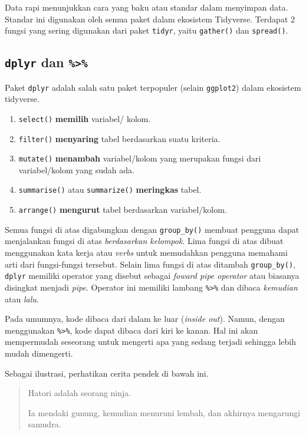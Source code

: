\documentclass[]{book}
\providecommand{\tightlist}{%
  \setlength{\itemsep}{0pt}\setlength{\parskip}{0pt}}
\begin{document}
Data rapi menunjukkan cara yang baku atau standar dalam menyimpan data.
Standar ini digunakan oleh semua paket dalam ekosistem Tidyverse.
Terdapat 2 fungsi yang sering digunakan dari paket \texttt{tidyr}, yaitu
\texttt{gather()} dan \texttt{spread()}.

\subsection{\texorpdfstring{\texttt{dplyr} dan
\texttt{\%\textgreater{}\%}}{dplyr dan \%\textgreater{}\%}}\label{dplyr-dan}

Paket \texttt{dplyr} adalah salah satu paket terpopuler (selain
\texttt{ggplot2}) dalam ekosistem tidyverse.

\begin{enumerate}
\def\labelenumi{\arabic{enumi}.}
\tightlist
\item
  \texttt{select()} \textbf{memilih} variabel/ kolom.
\item
  \texttt{filter()} \textbf{menyaring} tabel berdasarkan suatu kriteria.
\item
  \texttt{mutate()} \textbf{menambah} variabel/kolom yang merupakan
  fungsi dari variabel/kolom yang sudah ada.
\item
  \texttt{summarise()} atau \texttt{summarize()} \textbf{meringkas}
  tabel.
\item
  \texttt{arrange()} \textbf{mengurut} tabel berdasarkan variabel/kolom.
\end{enumerate}

Semua fungsi di atas digabungkan dengan \texttt{group\_by()} membuat
pengguna dapat menjalankan fungsi di atas \emph{berdasarkan kelompok}.
Lima fungsi di atas dibuat menggunakan kata kerja atau \emph{verbs}
untuk memudahkan pengguna memahami arti dari fungsi-fungsi tersebut.
Selain lima fungsi di atas ditambah \texttt{group\_by()}, \texttt{dplyr}
memiliki operator yang disebut sebagai \emph{foward pipe operator} atau
biasanya disingkat menjadi \emph{pipe}. Operator ini memiliki lambang
\texttt{\%\textgreater{}\%} dan dibaca \emph{kemudian} atau \emph{lalu}.

Pada umumnya, kode dibaca dari dalam ke luar (\emph{inside out}). Namun,
dengan menggunakan \texttt{\%\textgreater{}\%}, kode dapat dibaca dari
kiri ke kanan. Hal ini akan mempermudah seseorang untuk mengerti apa
yang sedang terjadi sehingga lebih mudah dimengerti.

Sebagai ilustrasi, perhatikan cerita pendek di bawah ini.

\begin{quote}
Hatori adalah seorang ninja.

Ia mendaki gunung, kemudian menuruni lembah, dan akhirnya mengarungi
samudra.
\end{quote}
\end{document}

